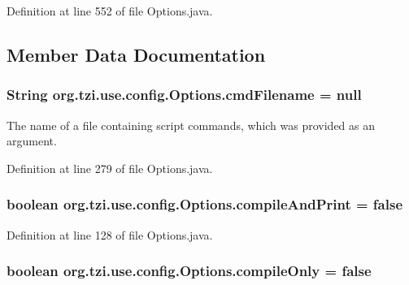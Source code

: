Definition at line 552 of file Options.\-java.



\subsection{Member Data Documentation}
\hypertarget{classorg_1_1tzi_1_1use_1_1config_1_1_options_ae43e418dcb9adb3d35ab10572968e847}{
\subsubsection[{cmd\-Filename}]{\setlength{\rightskip}{0pt plus 5cm}String org.\-tzi.\-use.\-config.\-Options.\-cmd\-Filename = null\hspace{0.3cm}{\ttfamily [static]}}}\label{classorg_1_1tzi_1_1use_1_1config_1_1_options_ae43e418dcb9adb3d35ab10572968e847}
The name of a file containing script commands, which was provided as an argument. 

Definition at line 279 of file Options.\-java.

\hypertarget{classorg_1_1tzi_1_1use_1_1config_1_1_options_a05cf418454b72a1f87b49328207aba9d}{
\subsubsection[{compile\-And\-Print}]{\setlength{\rightskip}{0pt plus 5cm}boolean org.\-tzi.\-use.\-config.\-Options.\-compile\-And\-Print = false\hspace{0.3cm}{\ttfamily [static]}}}\label{classorg_1_1tzi_1_1use_1_1config_1_1_options_a05cf418454b72a1f87b49328207aba9d}


Definition at line 128 of file Options.\-java.

\hypertarget{classorg_1_1tzi_1_1use_1_1config_1_1_options_a5db9fc9a8c668b5680192c87b85873a8}{
\subsubsection[{compile\-Only}]{\setlength{\rightskip}{0pt plus 5cm}boolean org.\-tzi.\-use.\-config.\-Options.\-compile\-Only = false\hspace{0.3cm}{\ttfamily [static]}}}\label{classorg_1_1tzi_1_1use_1_1config_1_1_options_a5db9fc9a8c668b5680192c87b85873a8}


